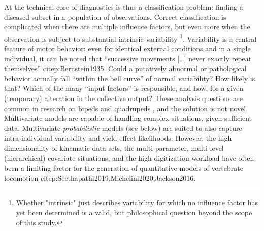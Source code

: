 \documentclass[10pt,a4paper]{article}
\begin{document}
At the technical core of diagnostics is thus a classification problem: finding a diseased subset in a population of observations.
Correct classification is complicated when there are multiple influence factors, but even more when the observation is subject to substantial intrinsic variability \footnote{Whether "intrinsic" just describes variability for which no influence factor has yet been determined is a valid, but philosophical question beyond the scope of this study.}.
Variability is a central feature of motor behavior: even for identical external conditions and in a single individual, it can be noted that ``successive movements [\ldots{}] never exactly repeat themselves'' citep:Bernstein1935.
Could a putatively abnormal or pathological behavior actually fall ``within the bell curve'' of normal variability?
How likely is that?
Which of the many ``input factors'' is responsible, and how, for a given (temporary) alteration in the collective output?
These analysis questions are common in research on bipeds  \citep[e.g.][]{Ganley2005,StifflerJoachim2020,Bruton2013} and quadrupeds  \citep[e.g.][]{Irschick1999,Pike2002,Stavrakakis2014}, and the solution is not novel.
Multivariate models are capable of handling complex situations, given sufficient data.
Multivariate \emph{probabilistic} models (see below) are suited to also capture intra-individual variability and yield effect likelihoods.
However, the high dimensionality of kinematic data sets, the multi-parameter, multi-level (hierarchical) covariate situations, and the high digitization workload have often been a limiting factor for the generation of quantitative models of vertebrate locomotion citep:Seethapathi2019,Michelini2020,Jackson2016.


\bigskip
\end{document}
